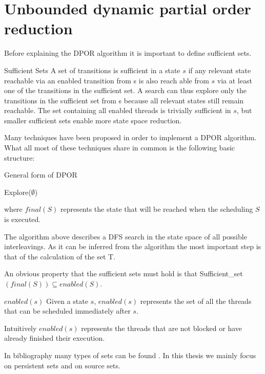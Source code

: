 \section{Unbounded dynamic partial order reduction}

Before explaining the DPOR algorithm it is important to define sufficient sets.

\begin{definition}{Sufficient Sets}
A set of transitions is sufficient in a state $s$ if any relevant
state reachable via an enabled transition from s is also reach able from $s$ via at least one of the transitions in the sufficient
set. A search can thus explore only the transitions in the
sufficient set from s because all relevant states still remain
reachable. The set containing all enabled threads is trivially
sufficient in $s$, but smaller sufficient sets enable more state
space reduction.
\end{definition}

Many techniques have been proposed in order to implement a DPOR algorithm. What all most of these techniques share in common is the following basic structure:

\begin{algorithm}[H]
    \caption{General form of DPOR}
    Explore($\emptyset$)\;
\end{algorithm}

where $final(S)$ represents the state that will be reached when the scheduling $S$ is executed.

The algorithm above describes a DFS search in the state space of all possible interleavings.
As it can be inferred from the algorithm the most important step is that of the calculation of the set T.

An obvious property that the sufficient sets must hold is that Sufficient\_set$(final(S)) \subseteq enabled(S)$.

\begin{definition}{$enabled(s)$}
    Given a state $s$, $enabled(s)$ represents the set of all the threads that can be scheduled immediately after $s$.
\end{definition}

Intuitively $enabled(s)$ represents the threads that are not blocked or have already finished their execution.

In bibliography many types of sets can be found \cite{Godefroid1996}. In this thesis we mainly focus on persistent sets and on source sets.


